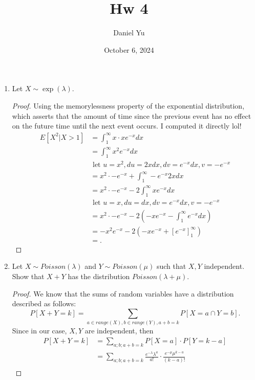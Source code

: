 \documentclass[a4paper]{article}
\title{\Huge{Hw 4}}
\author{\huge{Daniel Yu}}
\date{October 6, 2024}
\begin{document}
\maketitle
\newpage%
\pagebreak
\begin{enumerate}
  \item Let $X\sim \exp(\lambda)$.
    \begin{proof}
      Using the memorylessness property of the exponential distribution, which asserts that the amount of time since the previous event has no effect on the future time until the next event occurs. I computed it directly lol!
      \begin{align*}
        E[X^{2} | X > 1] &= \int_{1}^{\infty} x \cdot xe^{-x} dx \\
                         &= \int_{1}^{\infty}  x^{2} e^{-x} dx \\
                         &\text{ let $u = x^{2}, du = 2xdx, dv = e^{-x}dx, v = -e^{-x}$}\\
                         &= x^{2} \cdot -e^{-x} + \int_{1}^{\infty} -e^{-x} 2xdx \\
                         &= x^{2} \cdot -e^{-x} -2  \int_{1}^{\infty} xe^{-x} dx \\
                         &\text{ let $u = x, du = dx, dv = e^{-x}dx, v = -e^{-x}$}\\ 
                         &=  x^{2} \cdot -e^{-x} -2\left( -xe^{-x} - \int_{1}^{\infty} e^{-x} dx \right)   \\
                         &= -x^{2}e^{-x} -2(-xe^{-x} + [e^{-x}]_{1}^{\infty}) \\
                         &=
      .\end{align*}
    \end{proof}
  \item Let $X \sim Poisson(\lambda)$ and  $Y \sim Poisson(\mu)$ such that  $X,Y$ independent. Show that  $X+Y$ has the distribution  $Poisson(\lambda + \mu)$. 
     \begin{proof}
       We know that the sums of random variables have a distribution described as follows:
       \[
         P[X + Y = k]=\sum_{a \in range(X), b \in range(Y), a + b = k} P[X=a \cap Y = b] 
       .\] 
       Since in our case, $X,Y$ are independent, then
        \begin{align*}
          P[X+Y = k] &= \sum_{a;b;a+b=k} P[X = a] \cdot P[Y = k-a]\\
                     &= \sum_{a;b;a+b=k} \frac{e^{-\lambda} \lambda^{a}}{a!} \cdot \frac{e^{-\mu}\mu^{k-a}}{(k-a)!} \\

\end{align*}
\end{proof}
\end{enumerate}
\end{document}
